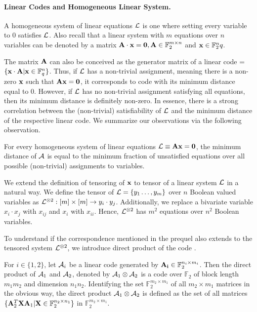 {\paragraph{Linear Codes and Homogeneous Linear System.}

A homogeneous system of linear equations ${\cal L}$ is one where setting
every variable to $0$ satisfies ${\cal L}$. Also recall that a linear
system with $m$ equations over $n$ variables can be denoted by a
matrix ${\bf A \cdot x } = {\bf 0}, {\bf A} \in \mathbb{F}_2^{m\times
  n}$ and ${\bf x} \in {\mathbb F}^n_2q$.

The matrix ${\bf A}$ can also be conceived as the generator matrix of
a linear code \A = $\{ {\bf x \cdot A} | {\bf x} \in
\mathbb{F}^n_q\}$.  Thus, if ${\cal L}$ has a non-trivial assignment,
meaning there is a non-zero ${\bf x}$ such that ${\bf Ax} = {\bf 0}$,
it corresponds to code with its minimum distance equal to
$0$. However, if ${\cal L}$ has no non-trivial assignment satisfying all
equations, then its minimum distance is definitely non-zero. In
essence, there is a strong correlation between the (non-trivial)
satisfiability of ${\cal L}$ and the minimum distance of the respective
linear code. We summarize our observations via the following
observation.

\begin{observation}
For every homogeneous system of linear equations ${\cal L} \equiv {\bf Ax = 0}$,
the minimum distance of ${\cal A}$ is equal to the minimum fraction of 
unsatisfied equations over all possible (non-trivial) assignments
to variables.
\end{observation}

We extend the definition of tensoring of ${\bf x}$ to tensor of a
linear system ${\cal L}$ in a natural way. We define the tensor of ${\cal L} =
\{y_1 \ldots, y_m\}$ over $n$ Boolean valued variables as
${\cal L}^{\otimes 2} : [m] \times [m] \rightarrow y_i \cdot
y_j$. Additionally, we replace a bivariate variable $x_i \cdot x_j$
with $x_{ij}$ and $x_i$ with $x_{ii}$. Hence, ${\cal L}^{\otimes 2}$ has
$m^2$ equations over $n^2$ Boolean variables.  


To understand if the correspondence mentioned in the prequel also
extends to the tensored system ${\cal L}^{\otimes 2}$, we introduce direct
product of the code \cite{ECC}. %
\begin{definition}
  For $i \in \{1, 2\}$, let ${\cal A}_i$ be a linear code generated by ${\bf
    A_i} \in \mathbb{F}_2^{n_i \times m_i}$.  Then the direct product
  of ${\cal A}_1$ and ${\cal A}_2$, denoted by ${\cal A}_1 \otimes {\cal A}_2$ is a code over
  $\mathbb{F}_2$ of block length $m_1m_2$ and dimension
  $n_1n_2$. Identifying the set $\mathbb{F}_2^{m_2 \times m_1}$ of all
  $m_2 \times m_1$ matrices in the obvious way, the direct product
  ${\cal A}_1 \otimes {\cal A}_2$ is defined as the set of all matrices $\{{\bf
    A}_2^T {\bf XA}_1 | {\bf X} \in \mathbb{F}_2^{n_2 \times n_1} \}$
  in $\mathbb{F}_2^{m_2 \times m_1}$.
\end{definition}

}
